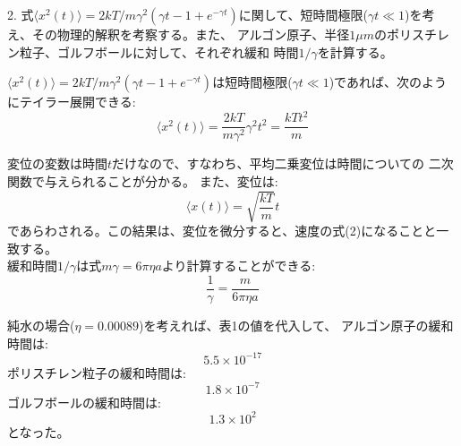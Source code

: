 \documentclass[a4paper,10pt]{jsarticle}
\begin{document}
  2. 式$\langle x^2(t) \rangle = {2kT}/{m\gamma^2 (\gamma t - 1 + e^{-\gamma t})}$に関して、短時間極限($\gamma t \ll 1$)を考え、その物理的解釈を考察する。また、
  アルゴン原子、半径$1\mu m$のポリスチレン粒子、ゴルフボールに対して、それぞれ緩和
  時間$1/\gamma$を計算する。
  
  $\langle x^2(t) \rangle = {2kT}/{m\gamma^2 (\gamma t - 1 + e^{-\gamma t})}$は短時間極限($\gamma t \ll 1$)であれば、次のようにテイラー展開できる:
  \begin{equation}
  \langle x^2(t) \rangle = \frac{2kT}{m\gamma^2} \gamma^2 t^2 = \frac{kTt^2}{m}
  \end{equation}
  
  変位の変数は時間$t$だけなので、すなわち、平均二乗変位は時間についての
  二次関数で与えられることが分かる。
  また、変位は:
  \begin{equation}
  \langle x(t) \rangle = \sqrt{\frac{kT}{m}}t
  \end{equation}
  であらわされる。この結果は、変位を微分すると、速度の式(2)になることと一致する。\\
  
  緩和時間$1/\gamma$は式$m\gamma = 6\pi\eta a$より計算することができる:
  \begin{equation}
  \frac{1}{\gamma} = \frac{m}{6\pi\eta a}
  \end{equation}

  純水の場合($\eta = 0.00089$)を考えれば、表1の値を代入して、
  アルゴン原子の緩和時間は:
  \begin{equation}
    5.5 \times 10^{-17}
    \end{equation}
    ポリスチレン粒子の緩和時間は:
    \begin{equation}
    1.8 \times 10^{-7}
    \end{equation}
    ゴルフボールの緩和時間は:
    \begin{equation}
    1.3 \times 10^{2}
    \end{equation}
    となった。\\
\end{document}
